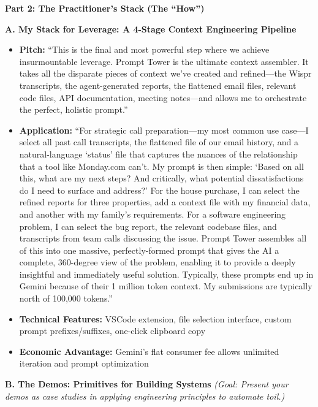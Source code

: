 \documentclass[
  ignorenonframetext,
  aspectratio=169,
]{beamer}
\providecommand{\tightlist}{%
  \setlength{\itemsep}{0pt}\setlength{\parskip}{0pt}}
\begin{document}
\begin{frame}{\textbf{Part 2: The Practitioner's Stack (The ``How'')}}
\begin{block}{\textbf{A. My Stack for Leverage: A 4-Stage Context
Engineering Pipeline}}
\begin{itemize}
  \begin{itemize}
  \tightlist
  \item
    \textbf{Pitch:} ``This is the final and most powerful step where we
    achieve insurmountable leverage. Prompt Tower is the ultimate
    context assembler. It takes all the disparate pieces of context
    we've created and refined---the Wispr transcripts, the
    agent-generated reports, the flattened email files, relevant code
    files, API documentation, meeting notes---and allows me to
    orchestrate the perfect, holistic prompt.''\\
  \item
    \textbf{Application:} ``For strategic call preparation---my most
    common use case---I select all past call transcripts, the flattened
    file of our email history, and a natural-language `status' file that
    captures the nuances of the relationship that a tool like Monday.com
    can't. My prompt is then simple: `Based on all this, what are my
    next steps? And critically, what potential dissatisfactions do I
    need to surface and address?' For the house purchase, I can select
    the refined reports for three properties, add a context file with my
    financial data, and another with my family's requirements. For a
    software engineering problem, I can select the bug report, the
    relevant codebase files, and transcripts from team calls discussing
    the issue. Prompt Tower assembles all of this into one massive,
    perfectly-formed prompt that gives the AI a complete, 360-degree
    view of the problem, enabling it to provide a deeply insightful and
    immediately useful solution. Typically, these prompts end up in
    Gemini because of their 1 million token context. My submissions are
    typically north of 100,000 tokens.''
  \item
    \textbf{Technical Features:} VSCode extension, file selection
    interface, custom prompt prefixes/suffixes, one-click clipboard copy
  \item
    \textbf{Economic Advantage:} Gemini's flat consumer fee allows
    unlimited iteration and prompt optimization
  \end{itemize}
\end{itemize}
\end{block}

\begin{block}{\textbf{B. The Demos: Primitives for Building Systems}}
\label{b.-the-demos-primitives-for-building-systems}
\emph{(Goal: Present your demos as case studies in applying engineering
principles to automate toil.)}


\end{block}
\end{frame}
\end{document}
